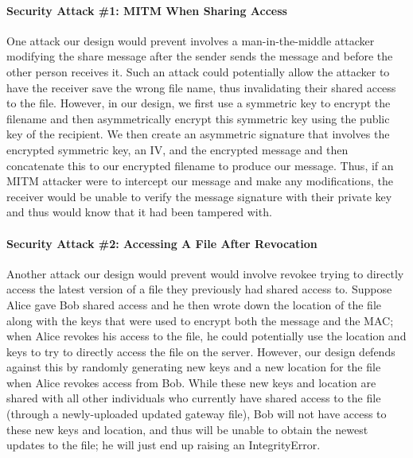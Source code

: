 \documentclass[12pt]{exam}
\begin{document}
\paragraph{Security Attack \#1: MITM When Sharing Access} One attack our design would prevent involves a man-in-the-middle attacker modifying the share message after the sender sends the message and before the other person receives it. Such an attack could potentially allow the attacker to have the receiver save the wrong file name, thus invalidating their shared access to the file. However, in our design, we first use a symmetric key to encrypt the filename and then asymmetrically encrypt this symmetric key using the public key of the recipient. We then create an asymmetric signature that involves the encrypted symmetric key, an IV, and the encrypted message and then concatenate this to our encrypted filename to produce our message. Thus, if an MITM attacker were to intercept our message and make any modifications, the receiver would be unable to verify the message signature with their private key and thus would know that it had been tampered with.

\paragraph{Security Attack \#2: Accessing A File After Revocation} Another attack our design would prevent would involve revokee trying to directly access the latest version of a file they previously had shared access to. Suppose Alice gave Bob shared access and he then wrote down the location of the file along with the keys that were used to encrypt both the message and the MAC; when Alice revokes his access to the file, he could potentially use the location and keys to try to directly access the file on the server. However, our design defends against this by randomly generating new keys and a new location for the file when Alice revokes access from Bob. While these new keys and location are shared with all other individuals who currently have shared access to the file (through a newly-uploaded updated gateway file), Bob will not have access to these new keys and location, and thus will be unable to obtain the newest updates to the file; he will just end up raising an IntegrityError.
\end{document}
